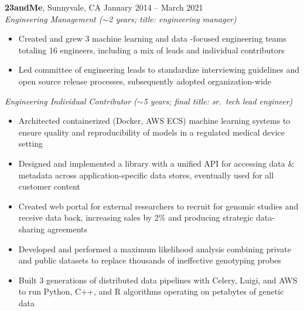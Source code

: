 \documentclass[margin,line]{resume}
\begin{document}
\begin{resume}
    \textbf{23andMe}, Sunnyvale, CA \hfill\vspace{1mm}\hfill January 2014 -- March 2021\\%
    \textsl{Engineering Management (\(\sim\)2 years; title: engineering manager)}
    \begin{itemize}
    \item Created and grew 3 machine learning and data -focused engineering teams totaling 16 engineers, including a mix of leads and individual contributors
    \item Led committee of engineering leads to standardize interviewing guidelines and open source release processes, subsequently adopted organization-wide
    \end{itemize}
    \textsl{Engineering Individual Contributor (\(\sim\)5 years; final title: sr.\ tech lead engineer)}
    \begin{itemize}
    \item Architected containerized (Docker, AWS ECS) machine learning systems to ensure quality and reproducibility of models in a regulated medical device setting
    \item Designed and implemented a library with a unified API for accessing data \& metadata across application-specific data stores, eventually used for all customer content
    \item Created web portal for external researchers to recruit for genomic studies and receive data back, increasing sales by 2\% and producing strategic data-sharing agreements
    \item Developed and performed a maximum likelihood analysis combining private and public datasets to replace thousands of ineffective genotyping probes
    \item Built 3 generations of distributed data pipelines with Celery, Luigi, and AWS to run Python, C++, and R algorithms operating on petabytes of genetic data
    \end{itemize}
    

\end{resume}
\end{document}
